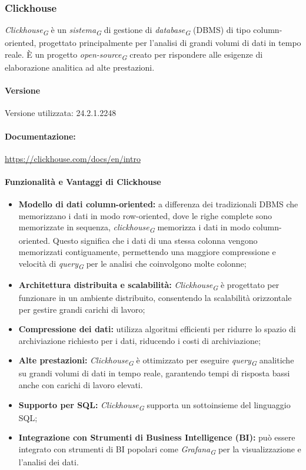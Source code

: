 \subsubsection{Clickhouse} \label{sec:clickHouse}
\textit{Clickhouse}\textsubscript{\textit{G}} è un \textit{sistema}\textsubscript{\textit{G}} di gestione di \textit{database}\textsubscript{\textit{G}} (DBMS) di tipo column-oriented, progettato principalmente per l'analisi di grandi volumi di dati in tempo reale. È un progetto \textit{open-source}\textsubscript{\textit{G}} creato per rispondere alle esigenze di elaborazione analitica ad alte prestazioni.

\paragraph{Versione}
Versione utilizzata: 24.2.1.2248
\paragraph{Documentazione:}
\url{https://clickhouse.com/docs/en/intro}

\paragraph{Funzionalità e Vantaggi di Clickhouse}
\begin{itemize}
    \item \textbf{Modello di dati column-oriented:} a differenza dei tradizionali DBMS che memorizzano i dati in modo row-oriented, dove le righe complete sono memorizzate in sequenza, \textit{clickhouse}\textsubscript{\textit{G}} memorizza i dati in modo column-oriented. Questo significa che i dati di una stessa colonna vengono memorizzati contiguamente, permettendo una maggiore compressione e velocità di \textit{query}\textsubscript{\textit{G}} per le analisi che coinvolgono molte colonne;
    \item \textbf{Architettura distribuita e scalabilità:} \textit{Clickhouse}\textsubscript{\textit{G}} è progettato per funzionare in un ambiente distribuito, consentendo la scalabilità orizzontale per gestire grandi carichi di lavoro;
    \item \textbf{Compressione dei dati:} utilizza algoritmi efficienti per ridurre lo spazio di archiviazione richiesto per i dati, riducendo i costi di archiviazione;
    \item \textbf{Alte prestazioni:} \textit{Clickhouse}\textsubscript{\textit{G}} è ottimizzato per eseguire \textit{query}\textsubscript{\textit{G}} analitiche su grandi volumi di dati in tempo reale, garantendo tempi di risposta bassi anche con carichi di lavoro elevati.
    \item \textbf{Supporto per SQL:} \textit{Clickhouse}\textsubscript{\textit{G}} supporta un sottoinsieme del linguaggio SQL;
    \item \textbf{Integrazione con Strumenti di Business Intelligence (BI):} può essere integrato con strumenti di BI popolari come \textit{Grafana}\textsubscript{\textit{G}} per la visualizzazione e l'analisi dei dati.
\end{itemize}


